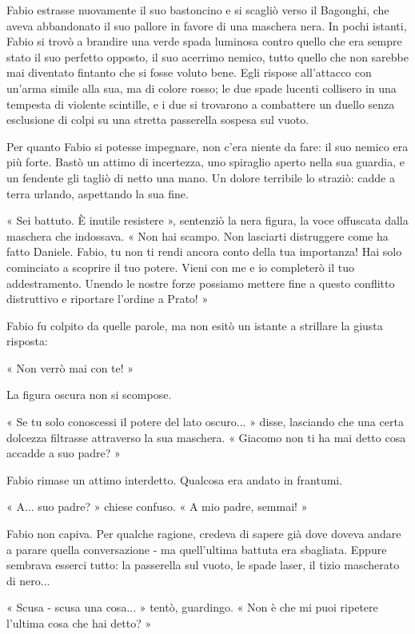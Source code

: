 Fabio estrasse nuovamente il suo bastoncino e si scagliò verso il Bagonghi, che aveva abbandonato il suo pallore in favore di una maschera nera. In pochi istanti, Fabio si trovò a brandire una verde spada luminosa contro quello che era sempre stato il suo perfetto opposto, il suo acerrimo nemico, tutto quello che non sarebbe mai diventato fintanto che si fosse voluto bene. Egli rispose all'attacco con un'arma simile alla sua, ma di colore rosso; le due spade lucenti collisero in una tempesta di violente scintille, e i due si trovarono a combattere un duello senza esclusione di colpi su una stretta passerella sospesa sul vuoto.

Per quanto Fabio si potesse impegnare, non c'era niente da fare: il suo nemico era più forte. Bastò un attimo di incertezza, uno spiraglio aperto nella sua guardia, e un fendente gli tagliò di netto una mano. Un dolore terribile lo straziò: cadde a terra urlando, aspettando la sua fine.

« Sei battuto. È inutile resistere », sentenziò la nera figura, la voce offuscata dalla maschera che indossava. « Non hai scampo. Non lasciarti distruggere come ha fatto Daniele. Fabio, tu non ti rendi ancora conto della tua importanza! Hai solo cominciato a scoprire il tuo potere. Vieni con me e io completerò il tuo addestramento. Unendo le nostre forze possiamo mettere fine a questo conflitto distruttivo e riportare l'ordine a Prato! »

Fabio fu colpito da quelle parole, ma non esitò un istante a strillare la giusta risposta:

« Non verrò mai con te! »

La figura oscura non si scompose.

« Se tu solo conoscessi il potere del lato oscuro... » disse, lasciando che una certa dolcezza filtrasse attraverso la sua maschera. « Giacomo non ti ha mai detto cosa accadde a suo padre? »

Fabio rimase un attimo interdetto. Qualcosa era andato in frantumi.

« A... suo padre? » chiese confuso. « A mio padre, semmai! »

Fabio non capiva. Per qualche ragione, credeva di sapere già dove doveva andare a parare quella conversazione - ma quell'ultima battuta era sbagliata. Eppure sembrava esserci tutto: la passerella sul vuoto, le spade laser, il tizio mascherato di nero...

« Scusa - scusa una cosa... » tentò, guardingo. « Non è che mi puoi ripetere l'ultima cosa che hai detto? »

